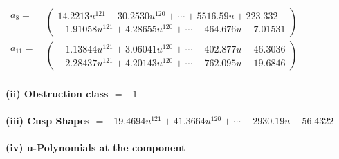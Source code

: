 \documentclass[1p]{elsarticle_modified}
\theoremstyle{definition}
\begin{document}
\begin{tabular}{m{7pt} m{180pt} m{7pt} m{180pt} }
\flushright $a_{8}=$&$\begin{pmatrix}14.2213 u^{121}-30.2530 u^{120}+\cdots+5516.59 u+223.332\\-1.91058 u^{121}+4.28655 u^{120}+\cdots-464.676 u-7.01531\end{pmatrix}$ \\
\flushright $a_{11}=$&$\begin{pmatrix}-1.13844 u^{121}+3.06041 u^{120}+\cdots-402.877 u-46.3036\\-2.28437 u^{121}+4.20143 u^{120}+\cdots-762.095 u-19.6846\end{pmatrix}$\\&\end{tabular}
\flushleft \textbf{(ii) Obstruction class $= -1$}\\~\\
\flushleft \textbf{(iii) Cusp Shapes $= -19.4694 u^{121}+41.3664 u^{120}+\cdots-2930.19 u-56.4322$}\\~\\
\newpage\renewcommand{\arraystretch}{1}
\flushleft \textbf{(iv) u-Polynomials at the component}\newline \\
\end{document}
